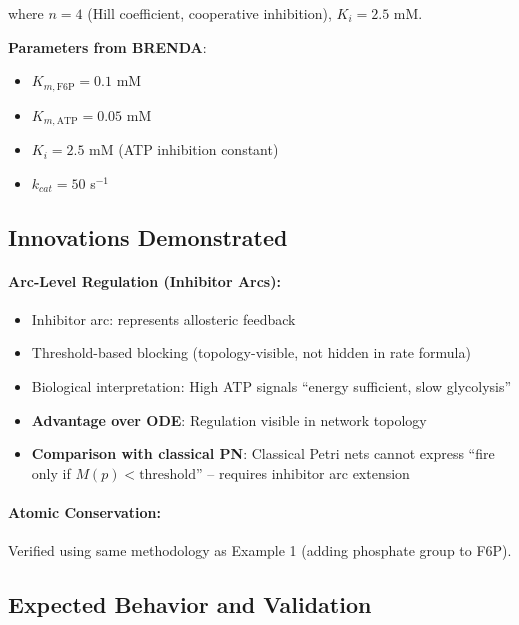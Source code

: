 where $n = 4$ (Hill coefficient, cooperative inhibition), $K_i = 2.5$ mM.

\textbf{Parameters from BRENDA}:
\begin{itemize}
    \item $K_{m,\text{F6P}} = 0.1$ mM
    \item $K_{m,\text{ATP}} = 0.05$ mM
    \item $K_i = 2.5$ mM (ATP inhibition constant)
    \item $k_{cat} = 50$ s$^{-1}$
\end{itemize}

\subsection{Innovations Demonstrated}
\label{subsec:pfk-innovations}

\paragraph{Arc-Level Regulation (Inhibitor Arcs):}

\begin{itemize}
    \item Inhibitor arc:  represents allosteric feedback
    \item Threshold-based blocking (topology-visible, not hidden in rate formula)
    \item Biological interpretation: High ATP signals ``energy sufficient, slow glycolysis''
    \item \textbf{Advantage over ODE}: Regulation visible in network topology
    \item \textbf{Comparison with classical PN}: Classical Petri nets cannot express ``fire only if $M(p) < \text{threshold}$'' -- requires inhibitor arc extension
\end{itemize}

\paragraph{Atomic Conservation:}

Verified using same methodology as Example 1 (adding phosphate group to F6P).

\subsection{Expected Behavior and Validation}
\label{subsec:pfk-validation}

